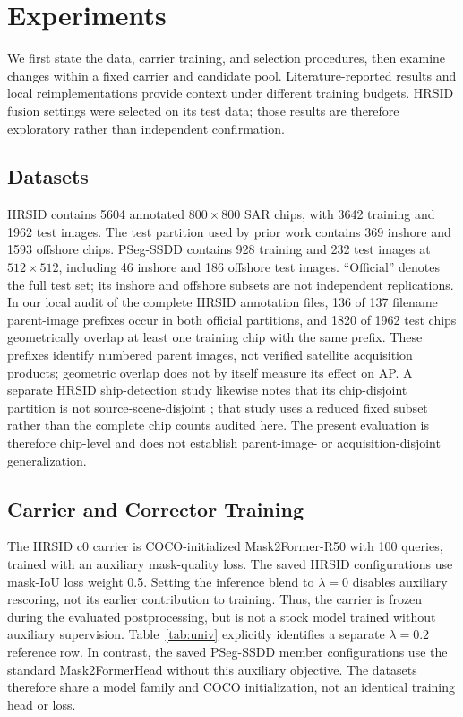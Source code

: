 \section{Experiments}\label{sec:exp}

We first state the data, carrier training, and selection procedures, then examine changes within a fixed carrier and candidate pool. Literature-reported results and local reimplementations provide context under different training budgets. HRSID fusion settings were selected on its test data; those results are therefore exploratory rather than independent confirmation.

\subsection{Datasets}\label{sec:exp:dataset}
HRSID \cite{hrsid2020} contains 5604 annotated $800\times800$ SAR chips, with 3642 training and 1962 test images. The test partition used by prior work \cite{o2former2025} contains 369 inshore and 1593 offshore chips. PSeg-SSDD contains 928 training and 232 test images at $512\times512$, including 46 inshore and 186 offshore test images. ``Official'' denotes the full test set; its inshore and offshore subsets are not independent replications. In our local audit of the complete HRSID annotation files, 136 of 137 filename parent-image prefixes occur in both official partitions, and 1820 of 1962 test chips geometrically overlap at least one training chip with the same prefix. These prefixes identify numbered parent images, not verified satellite acquisition products; geometric overlap does not by itself measure its effect on AP. A separate HRSID ship-detection study likewise notes that its chip-disjoint partition is not source-scene-disjoint \cite{xiaohmf2026}; that study uses a reduced fixed subset rather than the complete chip counts audited here. The present evaluation is therefore chip-level and does not establish parent-image- or acquisition-disjoint generalization.

\subsection{Carrier and Corrector Training}\label{sec:exp:setup}
The HRSID c0 carrier is COCO-initialized Mask2Former-R50 \cite{mask2former2022} with 100 queries, trained with an auxiliary mask-quality loss. The saved HRSID configurations use mask-IoU loss weight 0.5. Setting the inference blend to $\lambda=0$ disables auxiliary rescoring, not its earlier contribution to training. Thus, the carrier is frozen during the evaluated postprocessing, but is not a stock model trained without auxiliary supervision. Table~\ref{tab:univ} explicitly identifies a separate $\lambda=0.2$ reference row. In contrast, the saved PSeg-SSDD member configurations use the standard Mask2FormerHead without this auxiliary objective. The datasets therefore share a model family and COCO initialization, not an identical training head or loss.

